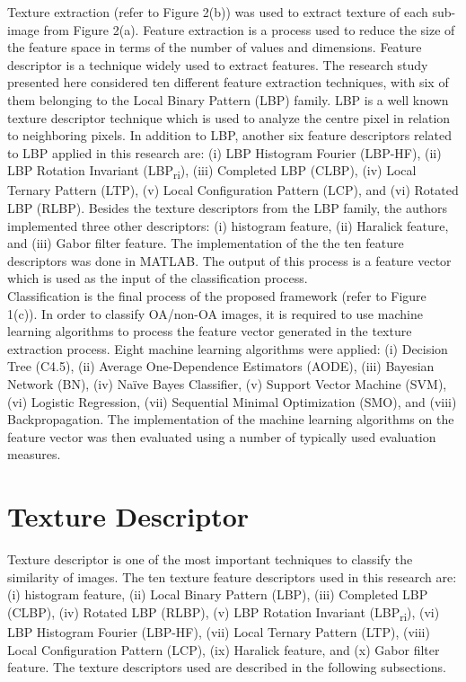 \documentclass[review]{elsarticle}
\begin{document}
Texture extraction (refer to Figure 2(b)) was used to extract texture of each sub-image from Figure 2(a). Feature extraction is a process used to reduce the size of the feature space in terms of the number of values and dimensions. Feature descriptor is a technique widely used to extract features. The research study presented here considered ten different feature extraction techniques, with six of them belonging to the Local Binary Pattern (LBP) family. LBP is a well known texture descriptor technique which is used to analyze the centre pixel in relation to neighboring pixels. In addition to LBP, another six feature descriptors related to LBP applied in this research are: (i) LBP Histogram Fourier (LBP-HF), (ii) LBP Rotation Invariant (LBP\textsubscript{ri}), (iii) Completed LBP (CLBP), (iv) Local Ternary Pattern (LTP), (v) Local Configuration Pattern (LCP), and (vi) Rotated LBP (RLBP). Besides the texture descriptors from the LBP family, the authors implemented three other descriptors: (i) histogram feature, (ii) Haralick feature, and (iii) Gabor filter feature. The implementation of the the ten feature descriptors was done in MATLAB. The output of this process is a feature vector which is used as the input of the classification process. \\

Classification is the final process of the proposed framework (refer to Figure 1(c)). In order to classify OA/non-OA images, it is required to use machine learning algorithms to process the feature vector generated in the texture extraction process. Eight machine learning algorithms were applied: (i) Decision Tree (C4.5), (ii) Average One-Dependence Estimators (AODE), (iii) Bayesian Network (BN), (iv) Na\"ive Bayes Classifier, (v) Support Vector Machine (SVM), (vi) Logistic Regression, (vii) Sequential Minimal Optimization (SMO), and (viii) Backpropagation. The implementation of the machine learning algorithms on the feature vector was then evaluated using a number of typically used evaluation measures.

\section{Texture Descriptor}

Texture descriptor is one of the most important techniques to classify the similarity of images. The ten texture feature descriptors used in this research are: (i) histogram feature, (ii) Local Binary Pattern (LBP), (iii) Completed LBP (CLBP), (iv) Rotated LBP (RLBP), (v) LBP Rotation Invariant (LBP\textsubscript{ri}), (vi) LBP Histogram Fourier (LBP-HF), (vii) Local Ternary Pattern (LTP), (viii) Local Configuration Pattern (LCP), (ix) Haralick feature, and (x) Gabor filter feature. The texture descriptors used are described in the following subsections.
\end{document}
